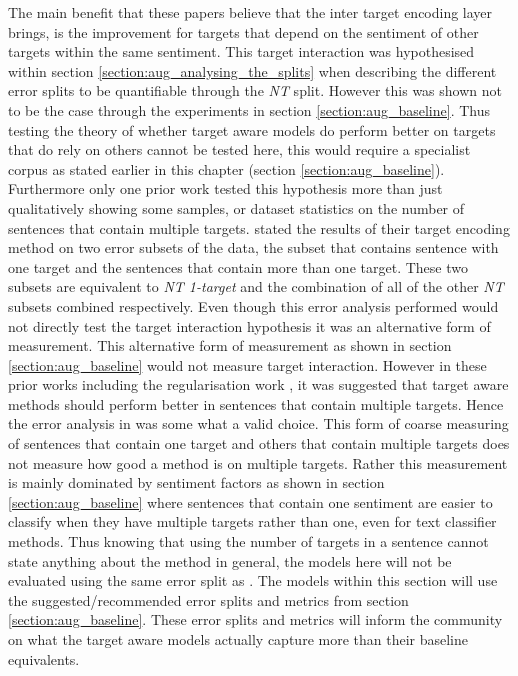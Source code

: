 The main benefit that these papers believe that the inter target encoding layer brings, is the improvement for targets that depend on the sentiment of other targets within the same sentiment. This target interaction was hypothesised within section \ref{section:aug_analysing_the_splits} when describing the different error splits to be quantifiable through the \textit{NT} split. However this was shown not to be the case through the experiments in section \ref{section:aug_baseline}. Thus testing the theory of whether target aware models do perform better on targets that do rely on others cannot be tested here, this would require a specialist corpus as stated earlier in this chapter (section \ref{section:aug_baseline}). Furthermore only one prior work \citep{majumder-etal-2018-iarm} tested this hypothesis more than just qualitatively showing some samples, or dataset statistics on the number of sentences that contain multiple targets. \citet{majumder-etal-2018-iarm} stated the results of their target encoding method on two error subsets of the data, the subset that contains sentence with one target and the sentences that contain more than one target. These two subsets are equivalent to \textit{NT 1-target} and the combination of all of the other \textit{NT} subsets combined respectively. Even though this error analysis \citet{majumder-etal-2018-iarm} performed would not directly test the target interaction hypothesis it was an alternative form of measurement. This alternative form of measurement as shown in section \ref{section:aug_baseline} would not measure target interaction. However in these prior works including the regularisation work \citep{fan-etal-2018-multi}, it was suggested that target aware methods should perform better in sentences that contain multiple targets. Hence the error analysis in \citet{majumder-etal-2018-iarm} was some what a valid choice. This form of coarse measuring of sentences that contain one target and others that contain multiple targets does not measure how good a method is on multiple targets. Rather this measurement is mainly dominated by sentiment factors as shown in section \ref{section:aug_baseline} where sentences that contain one sentiment are easier to classify when they have multiple targets rather than one, even for text classifier methods. Thus knowing that using the number of targets in a sentence cannot state anything about the method in general, the models here will not be evaluated using the same error split as \citet{majumder-etal-2018-iarm}. The models within this section will use the suggested/recommended error splits and metrics from section \ref{section:aug_baseline}. These error splits and metrics will inform the community on what the target aware models actually capture more than their baseline equivalents.


